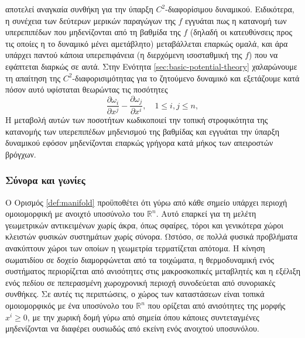 \documentclass[11pt,a4paper,twoside,openright]{book}
\begin{document}
αποτελεί αναγκαία συνθήκη για την ύπαρξη $C^2$-διαφορίσιμου δυναμικού.
Ειδικότερα, η συνέχεια των δεύτερων μερικών παραγώγων
της $f$ εγγυάται πως η κατανομή των υπερεπιπέδων που μηδενίζονται από τη βαθμίδα της $f$ (δηλαδή οι κατευθύνσεις προς τις οποίες η το δυναμικό μένει αμετάβλητο)
μεταβάλλεται επαρκώς ομαλά,
και άρα υπάρχει παντού κάποια υπερεπιφάνεια
(η διερχόμενη ισοσταθμική της $f$)
που να εφάπτεται διαρκώς σε αυτά.
Στην Ενότητα \ref{sec:basic-potential-theory} χαλαρώνουμε
τη απαίτηση της $C^2$-διαφορισιμότητας για το ζητούμενο δυναμικό και εξετάζουμε κατά πόσον αυτό υφίσταται
θεωρώντας τις ποσότητες
\begin{equation*}
\frac{\partial \omega_i}{\partial x^j}
-
\frac{\partial \omega_j}{\partial x^i},
\quad
1 \le i, j \le n,
\end{equation*}
Η μεταβολή αυτών των ποσοτήτων
κωδικοποιεί την τοπική στροφικότητα της κατανομής των υπερεπιπέδων μηδενισμού της βαθμίδας
και εγγυάται την ύπαρξη δυναμικού εφόσον μηδενίζονται επαρκώς γρήγορα κατά μήκος των απειροστών βρόγχων.

\subsubsection{Σύνορα και γωνίες}

Ο Ορισμός \ref{def:manifold} προϋποθέτει ότι γύρω από κάθε σημείο υπάρχει περιοχή ομοιομορφική με ανοιχτό υποσύνολο του $\mathbb{R}^n$. Αυτό επαρκεί για τη μελέτη γεωμετρικών αντικειμένων χωρίς άκρα, όπως σφαίρες, τόροι και γενικότερα χώροι κλειστών φυσικών συστημάτων χωρίς σύνορα. Ωστόσο, σε πολλά φυσικά προβλήματα ανακύπτουν χώροι των οποίων η γεωμετρία τερματίζεται απότομα. Η κίνηση σωματιδίου σε δοχείο διαμορφώνεται από τα τοιχώματα, η θερμοδυναμική ενός συστήματος περιορίζεται από ανισότητες στις μακροσκοπικές μεταβλητές και η εξέλιξη ενός πεδίου σε πεπερασμένη χωροχρονική περιοχή συνοδεύεται από συνοριακές συνθήκες. Σε αυτές τις περιπτώσεις, ο χώρος των καταστάσεων είναι τοπικά ομοιομορφικός με ένα υποσύνολο του $\mathbb{R}^n$ που ορίζεται από ανισότητες της μορφής $x^i \ge 0$, με την χωρική δομή γύρω από σημεία όπου κάποιες συντεταγμένες μηδενίζονται να διαφέρει ουσιωδώς από εκείνη ενός ανοιχτού υποσυνόλου.
\end{document}
